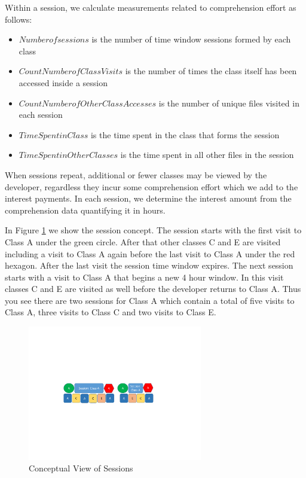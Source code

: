 Within a session, we calculate measurements related to comprehension effort as follows:
\begin{itemize}
	\item[] $Number of sessions$ is the number of time window sessions formed by each class 
	\item[] $Count Number of Class Visits$ is the number of times the class itself has been accessed inside a session 
	\item[] $Count Number of Other Class Accesses$ is the number of unique files visited in each session
	\item[] $Time Spent in Class$ is the time spent in the class that forms the session
	\item[] $Time Spent in Other Classes$ is the time spent in all other files in the session
\end{itemize}

When sessions repeat, additional or fewer classes may be viewed by the developer, regardless they incur some comprehension effort which we add to the interest payments.  In each session, we determine the interest amount from the comprehension data quantifying it in hours. 

In Figure \ref{fig:SessionDataConcept} we show the session concept.  The session starts with the first visit to Class A under the green circle.  After that other classes C and E are visited including a visit to Class A again before the last visit to Class A under the red hexagon.  After the last visit the session time window expires.  The next session starts with a visit to Class A that begins a new 4 hour window.  In this visit classes C and E are visited as well before the developer returns to Class A.  Thus you see there are two sessions for Class A which contain a total of five visits to Class A, three visits to Class C and two visits to Class E.
\begin{figure}
	\centering
	\includegraphics[width=3in]{SessionDataConcept.pdf}
	\caption{Conceptual View of Sessions}
	\label{fig:SessionDataConcept}
\end{figure}

